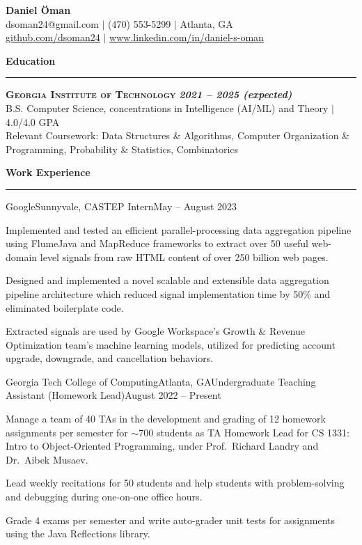 \documentclass{article}
\newcommand{\horizontal}{\vspace{2pt}\hrule}
\newcommand{\school}[3]{\vspace{2pt}\textsc{\textbf{#1}} \hfill \textbf{\textit{#2}} \\ #3}
\newcommand{\sectitle}[1]{\vspace{2pt} \textbf{\large #1} \horizontal}
\begin{document}
\thispagestyle{empty}
\begin{center}
    \textbf{\LARGE Daniel Öman} \\
    dsoman24@gmail.com $|$ (470) 553-5299 $|$ Atlanta, GA \\
    \href{https://github.com/dsoman24}{github.com/dsoman24} $|$ \href{https://www.linkedin.com/in/daniel-s-oman/}{www.linkedin.com/in/daniel-s-oman}
\end{center}

\begin{flushleft}
\sectitle{Education}

\school{Georgia Institute of Technology}{2021 -- 2025 (expected)}
{B.S. Computer Science, concentrations in Intelligence (AI/ML) and Theory $|$ 4.0/4.0 GPA \\ Relevant Coursework: Data Structures \& Algorithms, Computer Organization \& Programming, Probability \& Statistics, Combinatorics}

\sectitle{Work Experience}

    \begin{experience}{Google}{Sunnyvale, CA}{STEP Intern}{May -- August 2023}
        \item Implemented and tested an efficient parallel-processing data aggregation pipeline using FlumeJava and MapReduce frameworks to extract over 50 useful web-domain level signals from raw HTML content of over 250 billion web pages.
        \item Designed and implemented a novel scalable and extensible data aggregation pipeline architecture which reduced signal implementation time by 50\% and eliminated boilerplate code.
        \item Extracted signals are used by Google Workspace's Growth \& Revenue Optimization team's machine learning models, utilized for predicting account upgrade, downgrade, and cancellation behaviors.
    \end{experience}

    \begin{experience}{Georgia Tech College of Computing}{Atlanta, GA}{Undergraduate Teaching Assistant (Homework Lead)}{August 2022 -- Present}
        \item Manage a team of 40 TAs in the development and grading of 12 homework assignments per semester for $\sim$700 students as TA Homework Lead for CS 1331: Intro to Object-Oriented Programming, under Prof.~Richard Landry and Dr.~Aibek Musaev.
        \item Lead weekly recitations for 50 students and help students with problem-solving and debugging during one-on-one office hours.
        \item Grade 4 exams per semester and write auto-grader unit tests for assignments using the Java Reflections library.
    \end{experience}


\end{flushleft}
\end{document}
